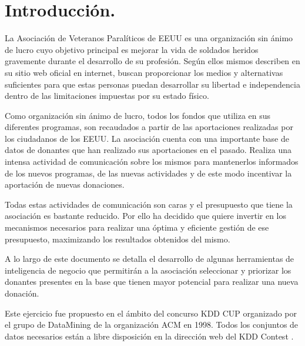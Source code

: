 \section{Introducción.}

La Asociación de Veteranos Paralíticos de EEUU \cite{PVA} es una organización sin ánimo de lucro cuyo objetivo principal es mejorar la vida de soldados heridos gravemente durante el desarrollo de su profesión. Según ellos mismos describen en su sitio web oficial en internet, buscan proporcionar los medios y alternativas suficientes para que estas personas puedan desarrollar su libertad e independencia dentro de las limitaciones impuestas por su estado físico.

Como organización sin ánimo de lucro, todos los fondos que utiliza en sus diferentes programas, son recaudados a partir de las aportaciones realizadas por los ciudadanos de los EEUU. La asociación cuenta con una importante base de datos de donantes que han realizado sus aportaciones en el pasado. Realiza una intensa actividad de comunicación sobre los mismos para mantenerlos informados de los nuevos programas, de las nuevas actividades y de este modo incentivar la aportación de nuevas donaciones.

Todas estas actividades de comunicación son caras y el presupuesto que tiene la asociación es bastante reducido. Por ello ha decidido que quiere invertir en los mecanismos necesarios para realizar una óptima y eficiente gestión de ese presupuesto, maximizando los resultados obtenidos del mismo.

A lo largo de este documento se detalla el desarrollo de algunas herramientas de inteligencia de negocio que permitirán a la asociación seleccionar y priorizar los donantes presentes en la base que tienen mayor potencial para realizar una nueva donación.

Este ejercicio fue propuesto en el ámbito del concurso KDD CUP \cite{KDD-CUP} organizado por el grupo de DataMining de la organización ACM \cite{SIGKDD-ACM} en 1998. Todos los conjuntos de datos necesarios están a libre disposición en la dirección web del KDD Contest \cite{KDD-CUP-1998}.